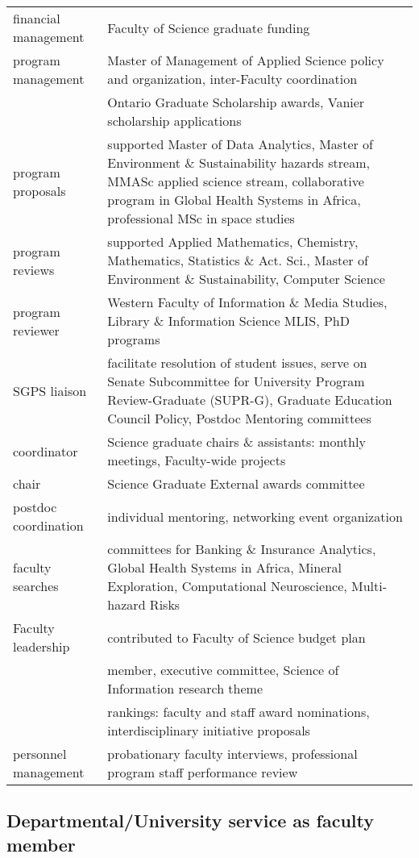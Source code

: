 \begin{tabularx}{\textwidth}{lX}
financial management & Faculty of Science graduate funding  \\
program management & Master of Management of Applied Science policy and organization, inter-Faculty coordination   \\
  & Ontario Graduate Scholarship awards, Vanier scholarship applications \\
program proposals &  supported Master of Data Analytics, Master of Environment \& Sustainability hazards stream, MMASc applied science stream, collaborative program in Global Health Systems in Africa, professional MSc in space studies  \\
program reviews & supported Applied Mathematics, Chemistry, Mathematics, Statistics \& Act. Sci., Master of Environment \& Sustainability, Computer Science  \\
program reviewer & Western Faculty of Information \& Media Studies, Library \& Information Science MLIS, PhD programs  \\
SGPS liaison  &  facilitate resolution of student issues, serve on Senate Subcommittee for University Program Review-Graduate (SUPR-G), Graduate Education Council Policy, Postdoc Mentoring committees  \\
coordinator & Science graduate chairs \& assistants: monthly meetings, Faculty-wide projects \\
chair & Science Graduate External awards committee  \\
postdoc coordination & individual mentoring, networking event organization  \\ 
faculty searches &  committees for  Banking \& Insurance Analytics, Global Health Systems in Africa, Mineral Exploration, Computational Neuroscience, Multi-hazard Risks  \\
Faculty leadership & contributed to Faculty of Science budget plan  \\
& member, executive committee, Science of Information research theme  \\
& rankings: faculty and staff award nominations, interdisciplinary initiative proposals  \\
personnel management & probationary faculty interviews, professional program staff performance review  \\

\end{tabularx}


\subsection{Departmental/University service as faculty member}

